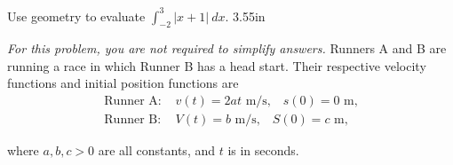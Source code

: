 \documentclass[12pt, addpoints]{exam}
\newcommand{\vstr}{\vspace{\stretch{1}}}
\theoremstyle{plain}
\begin{document}
\begin{questions}
\thispagestyle{headandfoot}
\question[10] Use geometry to evaluate $\int_{-2}^3|x+1|\ dx$.
\vspace
{3.55in}
%
\vstr 

\question \emph{For this problem, you are not required to simplify answers.}  Runners A and B are running a race in which Runner B has a head start.  Their respective velocity functions and initial position functions are
\vspace{-0.5pc}
\begin{align*}
\text{Runner A: }& v(t) =2at\text{ m/s,} \quad s(0) =0 \text{ m,} \\
\text{Runner B: }& V(t) =b\text{ m/s,} \quad S(0) =c \text{ m,}
\end{align*}

\vspace{-1.25pc}
where $a,b,c>0$ are all constants, and $t$ is in seconds.

\end{questions}
\end{document}
